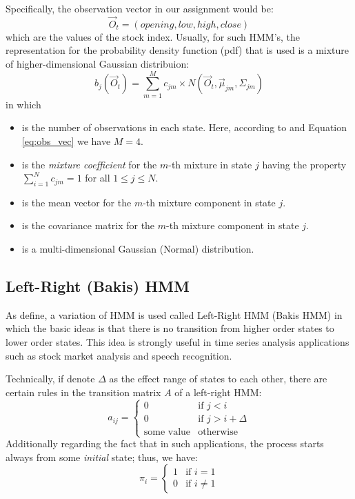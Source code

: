 \documentclass{acm_proc_article-sp}
\begin{document}
Specifically, the observation vector in our assignment would be:
\begin{equation} \label{eq:obs_vec}
\vec{O}_t = (opening, low, high, close)
\end{equation} 
which are the values of the stock index. Usually, for such HMM's, the representation for the probability density
function (pdf) that is used is a mixture of higher-dimensional Gaussian distribuion:
\begin{equation} \label{eq:mmgd}
b_j(\vec{O}_t) = \sum_{m=1}^{M} c_{jm} \times N(\vec{O}_t, \vec{\mu}_{jm}, \Sigma_{jm})
\end{equation}
in which
\begin{itemize}
  \item {} is the number of observations in each state. Here, according to \cite{hassan:hmm_stock} and
  Equation \ref{eq:obs_vec} we have $M = 4$.
  \item {} is the \textit{mixture coefficient} for the $m$-th mixture in state $j$ having the property
  $\sum_{i = 1}^{N} c_{jm} = 1$ for all $1 \leq j \leq N$.
  \item {} is the mean vector for the $m$-th mixture component in state $j$.
  \item {} is the covariance matrix for the $m$-th mixture component in state $j$.
  \item {} is a multi-dimensional Gaussian (Normal) distribution.
\end{itemize} 

\subsection{Left-Right (Bakis) HMM}
As \cite{rabiner:hmm,gpds:hmm_tut} define, a variation of HMM is used called Left-Right HMM (Bakis HMM) in which the
basic ideas is that there is no transition from higher order states to lower order states. This idea is strongly
useful in time series analysis applications such as stock market analysis and speech recognition.

Technically, if denote $\Delta$ as the effect range of states to each other, there are certain rules in the transition
matrix $A$ of a left-right HMM:
\begin{equation}
a_{ij} =  
\begin{cases}
0 & \text{if } j < i \\
0 & \text{if } j > i + \Delta \\
\text{some value} & \text{otherwise}
\end{cases}
\end{equation}
Additionally regarding the fact that in such applications, the process starts always from some \textit{initial} state;
thus, we have:
\begin{equation}
\pi_i = 
\begin{cases}
1 & \text{if } i = 1 \\
0 & \text{if } i \neq 1 
\end{cases}
\end{equation}
\end{document}
